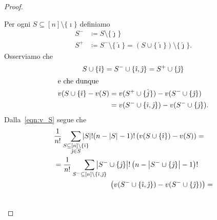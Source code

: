 \documentclass[a4paper,11pt]{article}
\theoremstyle{definition}				%
\theoremstyle{remark}
\theoremstyle{plain}
\begin{document}
\begin{proof}
\begin{itemize}
            Per ogni $S\subseteq[n]\setminus\{\hat{\imath}\}$ definiamo %
            \begin{align*}
                S^{-} &\coloneqq S\setminus\{\hat{\jmath}\} \\
                S^{+} &\coloneqq S^-\setminus\{\hat{\imath}\}=\left(S\cup\{\hat{\imath}\}\right)\setminus\{\hat{\jmath}\}.
            \end{align*}
            Osserviamo che 
            \begin{gather}
                S\cup\{\hat{\imath}\}=S^-\cup\{\hat{\imath},\hat{\jmath}\}=S^+\cup\{\hat{\jmath}\}\nonumber\\
                \intertext{e che dunque}
                \begin{split}\label{eqn:v_S}
                    v(S\cup\{\hat{\imath}\}-v(S) &= v(S^+\cup\{\hat{j}\})-v(S^-\cup\{\hat{\jmath}\})\\
                    &=v(S^-\cup\{\hat{\imath},\hat{\jmath}\})-v(S^-\cup\{\hat{\jmath}\}).
                \end{split}
            \end{gather}
            Dalla~\eqref{eqn:v_S} segue che
            \begin{align}
                & \frac{1}{n!} \smashoperator[r]{\sum_{\crampedsubstack{S\subseteq[n]\setminus\{\hat{\imath}\}\\\hat{\jmath}\in S}}}\qty|S|!(n-\qty|S|-1)!\left( v(S\cup\qty{\hat{\imath}})-v(S) \right)=\nonumber\\
                & \!\begin{multlined}[b]
                   = \frac{1}{n!}\smashoperator[r]{\sum_{S^-\subseteq[n]\setminus\{\hat{\imath},\hat{\jmath}\}}}\qty|S^-\cup\{\hat{\jmath}\}|!\left(n-\qty|S^-\cup\{\hat{\jmath}\}|-1\right)!\\
                    \left(v(S^-\cup\{\hat{\imath},\hat{\jmath}\})-v(S^-\cup\{\hat{\jmath}\})\right)
                \end{multlined}= \nonumber\\
                & \!\begin{multlined}[b]\label{eqn:sum_S-}

\end{multlined}
\end{align}
\end{itemize}
\end{proof}
\end{document}
